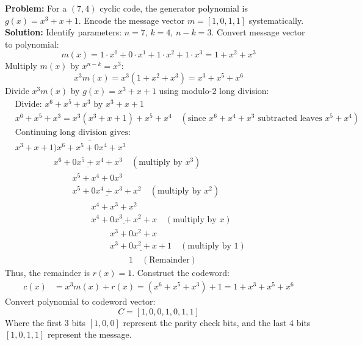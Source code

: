 \documentclass[12pt,a4paper]{article}
\begin{document}
\begin{tcolorbox}[examplebox, title={Worked Example: (7, 4) Cyclic Systematic Code}]
\textbf{Problem:} For a $(7, 4)$ cyclic code, the generator polynomial is $g(x) = x^3 + x + 1$. Encode the message vector $m = [1, 0, 1, 1]$ systematically.\\[4pt]
\textbf{Solution:}
Identify parameters: $n=7$, $k=4$, $n-k=3$.
Convert message vector to polynomial:
\begin{equation*}
  m(x) = 1 \cdot x^0 + 0 \cdot x^1 + 1 \cdot x^2 + 1 \cdot x^3 = 1 + x^2 + x^3
\end{equation*}
Multiply $m(x)$ by $x^{n-k} = x^3$:
\begin{equation*}
  x^3 m(x) = x^3 (1 + x^2 + x^3) = x^3 + x^5 + x^6
\end{equation*}
Divide $x^3 m(x)$ by $g(x) = x^3 + x + 1$ using modulo-2 long division:
\begin{align*}
  &\text{Divide: } x^6 + x^5 + x^3 \text{ by } x^3 + x + 1 \\
  &x^6 + x^5 + x^3 = x^3(x^3 + x + 1) + x^5 + x^4 \quad (\text{since } x^6+x^4+x^3 \text{ subtracted leaves } x^5+x^4) \\
  &\text{Continuing long division gives: } \\
  &x^3 + x + 1 \overline{) x^6 + x^5 + 0x^4 + x^3} \\
  &\phantom{x^3 + x + 1} \underline{x^6 + 0x^5 + x^4 + x^3} \quad (\text{multiply by } x^3) \\
  &\phantom{x^3 + x + 1} \phantom{x^6 + } x^5 + x^4 + 0x^3 \\
  &\phantom{x^3 + x + 1} \phantom{x^6 + } \underline{x^5 + 0x^4 + x^3 + x^2} \quad (\text{multiply by } x^2) \\
  &\phantom{x^3 + x + 1} \phantom{x^6 + x^5 + } x^4 + x^3 + x^2 \\
  &\phantom{x^3 + x + 1} \phantom{x^6 + x^5 + } \underline{x^4 + 0x^3 + x^2 + x} \quad (\text{multiply by } x) \\
  &\phantom{x^3 + x + 1} \phantom{x^6 + x^5 + x^4 + } x^3 + 0x^2 + x \\
  &\phantom{x^3 + x + 1} \phantom{x^6 + x^5 + x^4 + } \underline{x^3 + 0x^2 + x + 1} \quad (\text{multiply by } 1) \\
  &\phantom{x^3 + x + 1} \phantom{x^6 + x^5 + x^4 + x^3 + } 1 \quad (\text{Remainder})
\end{align*}
Thus, the remainder is $r(x) = 1$.
Construct the codeword:
\begin{align*}
  c(x) &= x^3 m(x) + r(x) = (x^6 + x^5 + x^3) + 1 = 1 + x^3 + x^5 + x^6
\end{align*}
Convert polynomial to codeword vector:
\begin{equation*}
  C = [1, 0, 0, 1, 0, 1, 1]
\end{equation*}
Where the first 3 bits $[1, 0, 0]$ represent the parity check bits, and the last 4 bits $[1, 0, 1, 1]$ represent the message.
\end{tcolorbox}
\end{document}
